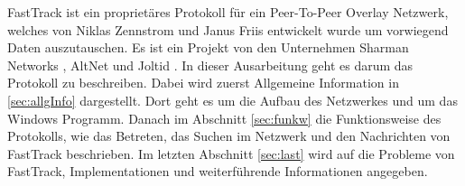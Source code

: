 FastTrack ist ein proprietäres Protokoll für ein Peer-To-Peer Overlay Netzwerk, welches von Niklas Zennstrom und Janus Friis entwickelt wurde um vorwiegend Daten auszutauschen. \cite{liang2006fasttrack}
Es ist ein Projekt von den Unternehmen Sharman Networks \cite{sharmanN}, AltNet \cite{fastTrack} und Joltid \cite{joltid}.
In dieser Ausarbeitung geht es darum das Protokoll zu beschreiben.
Dabei wird zuerst Allgemeine Information in \ref{sec:allgInfo} dargestellt.
Dort geht es um die Aufbau des Netzwerkes und um das Windows Programm.
Danach im Abschnitt \ref{sec:funkw} die Funktionsweise des Protokolls, wie das Betreten, das Suchen im Netzwerk und den Nachrichten von FastTrack beschrieben.
Im letzten Abschnitt \ref{sec:last} wird auf die Probleme von FastTrack, Implementationen und weiterführende Informationen angegeben. 